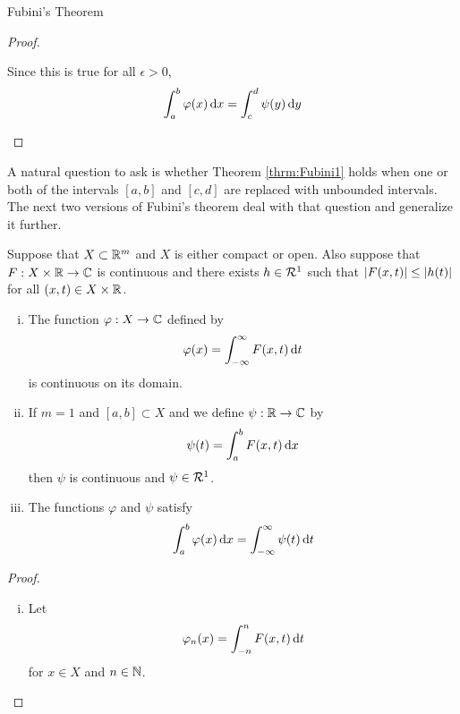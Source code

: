 \begin{section}{Fubini's Theorem}
\begin{proof}
\begin{enumerate}[i)]
	Since this is true for all $\epsilon > 0$, 
		\begin{displaymath}
		\myinta{a}{b}{\varphi(x)}{x} =
		\myinta{c}{d}{\psi(y)}{y}
		\end{displaymath}
	\end{enumerate}
\end{proof}


A natural question to ask is whether Theorem
\ref{thrm:Fubini1} holds when one or both of the
intervals $[a,b]$ and $[c,d]$ are replaced with
unbounded intervals. The next two versions of
Fubini's theorem deal with that question and generalize
it further.

\begin{thrm}\label{thrm:Fubini2}
	Suppose that $X \subset \real^m$ and $X$ is either
	compact or open. Also suppose that $F:X \times \real \to
	\cmplx$ is continuous and there exists $h \in \absint$
	such that $\modulus{F(x,t)} \leq \modulus{h(t)}$ for all
	$(x,t) \in X \times \real$.
	
	\begin{enumerate}[i)]
	\item
	The function $\varphi:X \to \cmplx$ defined by
		\begin{displaymath}
		\varphi(x) = \myintb{F(x,t)}{t}
		\end{displaymath}
	is continuous on its domain.
	
	\item
	If $m = 1$ and $[a,b] \subset X$ and we define $\psi:
	\real \to \cmplx$ by
		\begin{displaymath}
		\psi(t) = \myinta{a}{b}{F(x,t)}{x}
		\end{displaymath}
	then $\psi$ is continuous and $\psi \in \absint$.
	
	\item
	The functions $\varphi$ and $\psi$ satisfy
		\begin{displaymath}
		\myinta{a}{b}{\varphi(x)}{x} =
		\myintb{\psi(t)}{t}
		\end{displaymath}
	\end{enumerate}
\end{thrm}

\begin{proof}
		\begin{enumerate}[i)]
		\item
		Let
			\begin{displaymath}
			\varphi_n(x) = \myintb[n]{F(x,t)}{t}
			\end{displaymath}
		for $x \in X$ and $n \in \natrl$.
		

\end{enumerate}
\end{proof}
\end{section}
